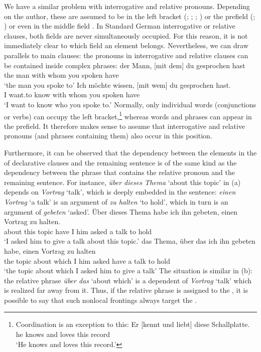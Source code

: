 We have a similar problem with interrogative and
relative pronouns. Depending on the author, these are assumed to be in the left bracket
(\citealp{Kathol2001a}; \citealp[--95]{Duerscheid2003a-u}; \citealp[]{Eisenberg2004a}; \citealp[]{Pafel2011a-u}) or the prefield
(\citealp[§1345]{Duden2005-Authors}; \citealp[--30, Section~3.1]{Woellstein2010a-u}) or even
in the middle field \citep[]{AH2004a-u}. In Standard German interrogative or relative
clauses, both fields are never simultaneously
occupied. For this reason, it is not immediately clear to which field an element
belongs. Nevertheless, we can draw parallels to main clauses: the pronouns in  interrogative and
relative clauses can be contained inside complex phrases: 
\eal
\ex 
\gll der Mann,         [mit dem] du gesprochen hast\\
     the man \spacebr{}with whom you spoken have\\
\glt `the man you spoke to'	 
\ex 
\gll Ich möchte wissen, [mit wem] du gesprochen hast.\\
     I want.to know \spacebr{}with whom you spoken have\\
\glt `I want to know who you spoke to.'
\zl
Normally, only individual words (conjunctions or verbs) can occupy the left bracket,\footnote{%
 Coordination is an exception to this:
\ea
\gll Er [kennt und liebt] diese Schallplatte.\\
     he \spacebr{}knows and loves this record\\
\glt `He knows and loves this record.'
\z
} 
whereas words and phrases can appear in the prefield. It therefore makes sense to assume that interrogative and relative pronouns (and phrases containing them)
also occur in this position. 

\addlines
Furthermore, it can be observed that the dependency between the elements in the \vf of declarative
clauses and the remaining sentence is of the same kind as the dependency between the phrase that
contains the relative pronoun and the remaining sentence. For instance, \emph{über dieses Thema}
`about this topic' in (a)
depends on \emph{Vortrag} `talk', which is deeply embedded in the sentence:
\emph{einen Vortrag} `a talk' is an argument of \emph{zu halten} `to hold', which in turn is an
argument of \emph{gebeten} `asked'.
\eal
\ex 
\gll Über dieses Thema habe ich ihn gebeten, einen Vortrag zu halten.\\
     about this topic  have I   him asked    a     talk    to hold\\
\glt `I asked him to give a talk about this topic.'
\ex 
\gll das Thema, über das ich ihn gebeten habe, einen Vortrag zu halten\\
     the topic  about which I him asked have a talk to hold\\
\glt `the topic about which I asked him to give a talk'
\zl
The situation is similar in (b): the relative phrase \emph{über das} `about which' is a dependent of
\emph{Vortrag} `talk' which is realized far away from it. Thus, if the relative phrase is assigned to the \vf, it is
possible to say that such nonlocal frontings always target the \vf.


